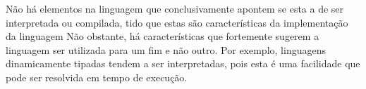 \newpage

 {
	Não há elementos na linguagem que conclusivamente apontem se esta a de ser
	interpretada ou compilada, tido que estas são características da
	implementação da linguagem Não obstante, há características que fortemente
	sugerem a linguagem ser utilizada para um fim e não outro. Por exemplo,
	linguagens dinamicamente tipadas tendem a ser interpretadas, pois esta é uma
	facilidade que pode ser resolvida em tempo de execução.
}



